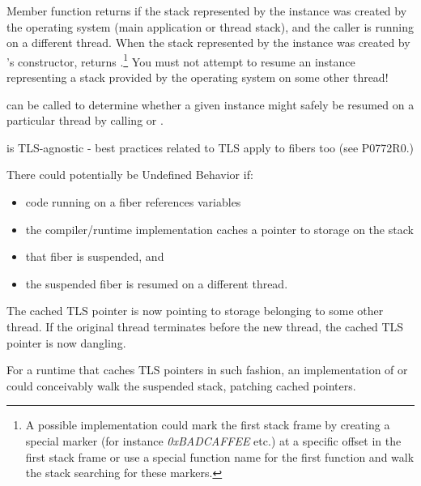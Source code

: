 
Member function \canxtresume returns  if the stack represented by the
\fiber instance was created by the operating system (main application or thread
stack), and the caller is running on a different thread. When the stack
represented by the \fiber instance was created by \fiber's
constructor, \canxtresume returns .\footnote{A possible
implementation could mark the first stack frame by creating a special marker
(for instance \emph{0xBADCAFFEE} etc.) at a specific offset in the first stack
frame or use a special function name for the first function and walk the stack
searching for these markers.} You must not attempt to resume an instance
representing a stack provided by the operating system on some other thread!

\canresume can be called to determine whether a given \fiber instance might
safely be resumed on a particular thread by calling \resume or \resumewith.

\fiber is TLS-agnostic - best practices related to TLS apply to fibers too
(see P0772R0.)

There could potentially be Undefined Behavior if:
\begin{itemize}
    \item code running on a fiber references  variables
    \item the compiler/runtime implementation caches a pointer
          to  storage on the stack
    \item that fiber is suspended, and
    \item the suspended fiber is resumed on a different thread.
\end{itemize}

The cached TLS pointer is now pointing to storage belonging to some other
thread. If the original thread terminates before the new thread, the cached
TLS pointer is now dangling.

For a runtime that caches TLS pointers in such fashion, an implementation
of \xtresume or\\
\xtresumewith could conceivably walk the suspended stack,
patching cached pointers.
